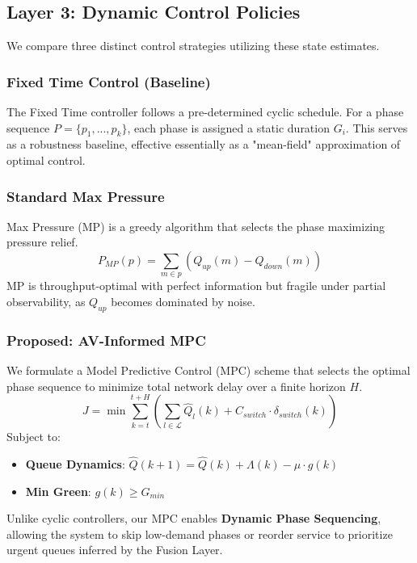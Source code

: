 \documentclass[conference]{IEEEtran}
\begin{document}
\subsection{Layer 3: Dynamic Control Policies}
We compare three distinct control strategies utilizing these state estimates.

\subsubsection{Fixed Time Control (Baseline)}
The Fixed Time controller follows a pre-determined cyclic schedule. For a phase sequence $P = \{p_1, ..., p_k\}$, each phase is assigned a static duration $G_i$. This serves as a robustness baseline, effective essentially as a "mean-field" approximation of optimal control.

\subsubsection{Standard Max Pressure}
Max Pressure (MP) is a greedy algorithm that selects the phase maximizing pressure relief.
\begin{equation}
    P_{MP}(p) = \sum_{m \in p} (Q_{up}(m) - Q_{down}(m))
\end{equation}
MP is throughput-optimal with perfect information but fragile under partial observability, as $Q_{up}$ becomes dominated by noise.

\subsubsection{Proposed: AV-Informed MPC}
We formulate a Model Predictive Control (MPC) scheme that selects the optimal phase sequence to minimize total network delay over a finite horizon $H$.
\begin{equation}
    J = \min \sum_{k=t}^{t+H} \left( \sum_{l \in \mathcal{L}} \hat{Q}_l(k) + C_{switch} \cdot \delta_{switch}(k) \right)
\end{equation}
Subject to:
\begin{itemize}
    \item \textbf{Queue Dynamics}: $\hat{Q}(k+1) = \hat{Q}(k) + \Lambda(k) - \mu \cdot g(k)$
    \item \textbf{Min Green}: $g(k) \geq G_{min}$
\end{itemize}
Unlike cyclic controllers, our MPC enables \textbf{Dynamic Phase Sequencing}, allowing the system to skip low-demand phases or reorder service to prioritize urgent queues inferred by the Fusion Layer.
\end{document}
